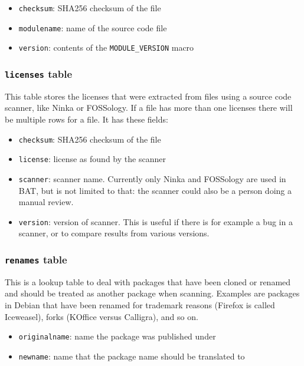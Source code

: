 \documentclass[10pt,a4paper]{article}
\begin{document}
\begin{itemize}
\item \texttt{checksum}: SHA256 checksum of the file
\item \texttt{modulename}: name of the source code file
\item \texttt{version}: contents of the \texttt{MODULE\_VERSION} macro
\end{itemize}

\subsubsection{\texttt{licenses} table}

This table stores the licenses that were extracted from files using a source
code scanner, like Ninka or FOSSology. If a file has more than one licenses
there will be multiple rows for a file. It has these fields:

\begin{itemize}
\item \texttt{checksum}: SHA256 checksum of the file
\item \texttt{license}: license as found by the scanner
\item \texttt{scanner}: scanner name. Currently only Ninka and FOSSology are
used in BAT, but is not limited to that: the scanner could also be a person
doing a manual review.
\item \texttt{version}: version of scanner. This is useful if there is for
example a bug in a scanner, or to compare results from various versions.
\end{itemize}

\subsubsection{\texttt{renames} table}

This is a lookup table to deal with packages that have been cloned or renamed
and should be treated as another package when scanning. Examples are packages
in Debian that have been renamed for trademark reasons (Firefox is called
Iceweasel), forks (KOffice versus Calligra), and so on.

\begin{itemize}
\item \texttt{originalname}: name the package was published under
\item \texttt{newname}: name that the package name should be translated to
\end{itemize}
\end{document}
